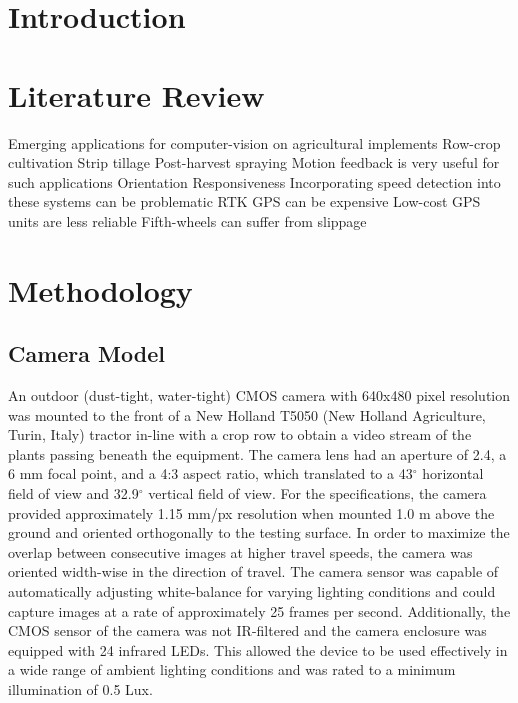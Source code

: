\begin{abstract}
\lipsum[1]
\end{abstract}

\section{Introduction}
\lipsum[1]

\section{Literature Review}
Emerging applications for computer-vision on agricultural implements
Row-crop cultivation
Strip tillage
Post-harvest spraying
Motion feedback is very useful for such applications
Orientation
Responsiveness
Incorporating speed detection into these systems can be problematic
RTK GPS can be expensive
Low-cost GPS units are less reliable
Fifth-wheels can suffer from slippage

\section{Methodology}

\subsection{Camera Model}
An outdoor (dust-tight, water-tight) CMOS camera with 640x480 pixel
resolution was mounted to the front of a New Holland T5050 (New
Holland Agriculture, Turin, Italy) tractor in-line with a crop row to
obtain a video stream of the plants passing beneath the equipment. The
camera lens had an aperture of 2.4, a 6 mm focal point, and a 4:3
aspect ratio, which translated to a 43$^{\circ}$ horizontal field of view and
32.9$^{\circ}$ vertical field of view. For the specifications, the camera
provided approximately 1.15 mm/px resolution when mounted 1.0 m above
the ground and oriented orthogonally to the testing surface. In order
to maximize the overlap between consecutive images at higher travel
speeds, the camera was oriented width-wise in the direction of
travel. The camera sensor was capable of automatically adjusting
white-balance for varying lighting conditions and could capture images
at a rate of approximately 25 frames per second. Additionally, the
CMOS sensor of the camera was not IR-filtered and the camera enclosure
was equipped with 24 infrared LEDs. This allowed the device to be used
effectively in a wide range of ambient lighting conditions and was
rated to a minimum illumination of 0.5 Lux.

